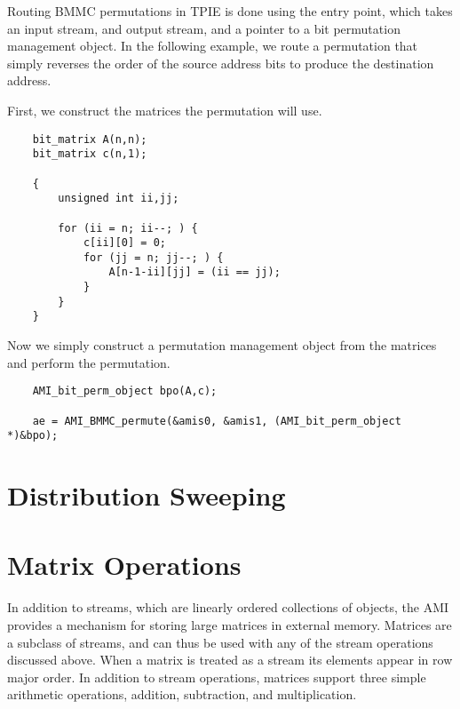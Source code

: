 Routing BMMC permutations in TPIE is done using the
 entry point, which takes an input stream, and output stream, and a
pointer to a bit permutation management object. In the following example,
we route a permutation that simply reverses the order of the source address
bits to produce the destination address.

First, we construct the matrices the permutation will use.
\begin{verbatim}
    bit_matrix A(n,n);
    bit_matrix c(n,1);

    {
        unsigned int ii,jj;

        for (ii = n; ii--; ) {
            c[ii][0] = 0;
            for (jj = n; jj--; ) {
                A[n-1-ii][jj] = (ii == jj);
            }
        }
    }
\end{verbatim}
Now we simply construct a permutation management object from the
matrices and perform the permutation.
\begin{verbatim}
    AMI_bit_perm_object bpo(A,c);
    
    ae = AMI_BMMC_permute(&amis0, &amis1, (AMI_bit_perm_object *)&bpo);
\end{verbatim}

\section{Distribution Sweeping} 

\tobewritten

\section{Matrix Operations}



In addition to streams, which are linearly ordered collections of objects,
the AMI provides a mechanism for storing large matrices in external memory.
Matrices are a subclass of streams, and can thus be used with any of the
stream operations discussed above.  When a matrix is treated as a stream
its elements appear in row major order.  In addition to stream operations,
matrices support three simple arithmetic operations, addition, subtraction,
and multiplication.

